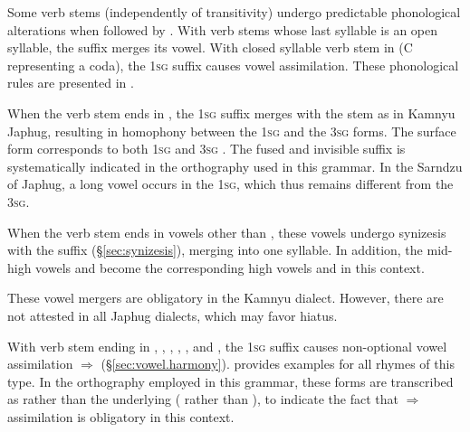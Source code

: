  Some verb stems (independently of transitivity) undergo predictable phonological alterations when followed by . With verb stems whose last syllable is an open syllable,  the  suffix merges its vowel. With closed syllable verb stem in  (C representing a coda), the \textsc{1sg} suffix causes vowel assimilation. These phonological rules are presented in .

When the verb stem ends in , the \textsc{1sg} suffix merges with the stem as  in Kamnyu Japhug, resulting in homophony between the \textsc{1sg} and the \textsc{3sg} forms. The surface form  corresponds to both \textsc{1sg}  and \textsc{3sg} . The fused and invisible suffix is systematically indicated in the orthography used in this grammar. In the Sarndzu of Japhug, a long vowel occurs in the \textsc{1sg}, which thus remains different from the \textsc{3sg}.

When the verb stem ends in vowels other than , these vowels undergo synizesis with the  suffix (§\ref{sec:synizesis}), merging into one syllable. In addition, the mid-high vowels  and  become the corresponding high vowels  and  in this context. 

These vowel mergers are obligatory in the Kamnyu dialect. However, there are not attested in all Japhug dialects, which may favor hiatus.

With verb stem ending in , , , , ,  and ,  the \textsc{1sg} suffix causes non-optional vowel assimilation  $\Rightarrow$  (§\ref{sec:vowel.harmony}).  provides examples for all rhymes of this type. In the orthography employed in this grammar, these forms are transcribed as  rather than the underlying  ( rather than ), to indicate the fact that  $\Rightarrow$  assimilation is obligatory in this context.

